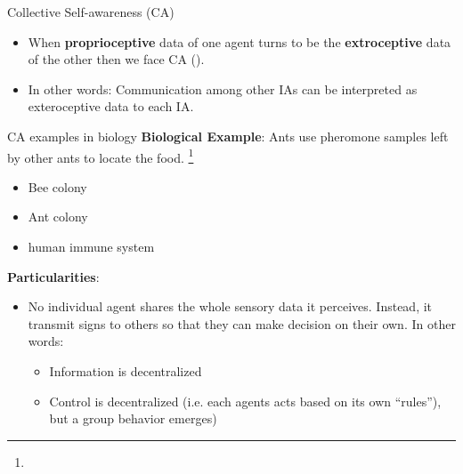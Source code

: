 \documentclass[unknownkeysallowed]{beamer}
\begin{document}
\begin{frame}{Collective Self-awareness (CA)}
	\begin{itemize}
		\item When \textbf{proprioceptive} data of one agent turns to be the \textbf{extroceptive} data of the other then we face CA (\textbf{\cite{regazzoni-2020-multi-sensorial-generative-and-descriptive-self-awareness-models-for-autonomous-systems}}).
		\item In other words: Communication among other IAs can be interpreted as exteroceptive data to each IA.
	\end{itemize}
\end{frame}

\begin{frame}{CA examples in biology}
	\textbf{Biological Example}: Ants use pheromone samples left by other ants to locate the food.  \footnote{\tiny{}}
	\begin{itemize}
		\item Bee colony
		\item Ant colony
		\item human immune system
	\end{itemize}
	\textbf{Particularities}:
	\begin{itemize}
		\item No individual agent shares the whole sensory data it perceives. Instead, it transmit signs to others so that they can make decision on their own. In other words:
		\begin{itemize}
			\item Information is decentralized
			\item Control is decentralized (i.e. each agents acts based on its own “rules”), but a group behavior emerges)
		\end{itemize} 
	\end{itemize}
\end{frame}
\end{document}
